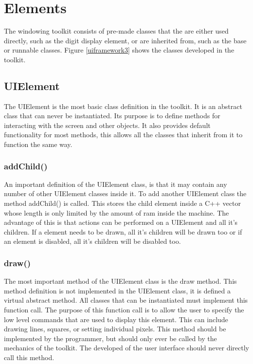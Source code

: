 \section{Elements}

The windowing toolkit consists of pre-made classes that the are either used directly, such as the digit display element, or are inherited from, such as the base or runnable classes. Figure \ref{uiframework3} shows the classes developed in the toolkit.


\subsection{UIElement}

The UIElement is the most basic class definition in the toolkit. It is an abstract class that can never be instantiated. Its purpose is to define methods for interacting with the screen and other objects. It also provides default functionality for most methods, this allows all the classes that inherit from it to function the same way.

\subsubsection{addChild()}

An important definition of the UIElement class, is that it may contain any number of other UIElement classes inside it. To add another UIElement class the method addChild() is called. This stores the child element inside a C++ vector whose length is only limited by the amount of ram inside the machine. The advantage of this is that actions can be performed on a UIElement and all it's children. If a element needs to be drawn, all it's children will be drawn too or if an element is disabled, all it's children will be disabled too.

\subsubsection{draw()}

 The most important method of the UIElement class is the draw method.  This method definition is not implemented in the UIElement class, it is defined a virtual abstract method. All classes that can be instantiated must implement this function call. The purpose of this function call is to allow the user to specify the low level commands that are used to display this element. This can include drawing lines, squares, or setting individual pixels. This method should be implemented by the programmer, but should only ever be called by the mechanics of the toolkit. The developed of the user interface should never directly call this method.

